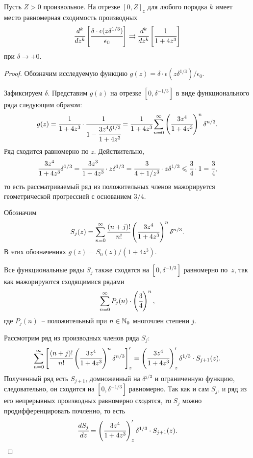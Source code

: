 \begin{proposition}
    \label{prop:convergence_uniform}
    Пусть $Z > 0$ произвольное. На отрезке $[0, Z]_z$ для любого порядка $k$ имеет место равномерная сходимость производных
    \[
        \cfrac{d^k}{d z^k} \left[ \cfrac{\delta \cdot \epsilon(z \delta^{1/3})}{\epsilon_0} \right] \rightrightarrows \cfrac{d^k}{d z^k} \left[ \cfrac{1}{1 + 4 z^3} \right]
    \]
    при $\delta \to +0$.
\end{proposition}
\begin{proof}

Обозначим исследуемую функцию $g(z) = \delta \cdot \epsilon(z \delta^{1/3}) / \epsilon_0$.

Зафиксируем $\delta$. Представим $g(z)$ на отрезке $[0, \delta^{-1/3}]$ в виде функционального ряда следующим образом:
\[
    g(z) = \cfrac{1}{1 + 4 z^3} \cdot \cfrac{1}{1 - \cfrac{3 z^4 \delta^{1/3}}{1 + 4 z^3}} = \cfrac{1}{1 + 4 z^3} \sum\limits_{n = 0}^\infty \left( \cfrac{3 z^4}{1 + 4 z^3} \right)^n \delta^{n / 3}.
\]
Ряд сходится равномерно по $z$. Действительно,
\[
    \cfrac{3 z^4}{1 + 4 z^3} \delta^{1/3} = \cfrac{3 z^3}{1 + 4 z^3} \cdot z \delta^{1/3} = \cfrac{3}{4 + 1 / z^3} \cdot z \delta^{1/3} \leqslant \cfrac{3}{4} \cdot 1 = \cfrac{3}{4},
\]
то есть рассматриваемый ряд из положительных членов мажорируется геометрической прогрессией с основанием $3/4$.

Обозначим
\[
    S_j(z) = \sum\limits_{n = 0}^\infty \cfrac{(n + j)!}{n!} \left( \cfrac{3 z^4}{1 + 4 z^3} \right)^n \delta^{n / 3}.
\]
В этих обозначениях $g(z) = S_0(z) / (1 + 4 z^3)$.

Все функциональные ряды $S_j$ также сходятся на $[0, \delta^{-1/3}]$ равномерно по~$z$, так как мажорируются сходящимися рядами
\[
    \sum\limits_{n = 0}^\infty P_j(n) \cdot \left( \cfrac{3}{4} \right)^n,
\]
где $P_j(n)$~-- положительный при $n \in {\mathbb{N}}_0$ многочлен степени $j$.

Рассмотрим ряд из производных членов ряда $S_j$:
\[
    \sum\limits_{n = 0}^\infty \left[ \cfrac{(n + j)!}{n!} \left( \cfrac{3 z^4}{1 + 4 z^3} \right)^n \delta^{n / 3} \right]'_z = \left( \cfrac{3 z^4}{1 + 4 z^3} \right)'_z \delta^{1/3} \cdot S_{j + 1}(z).
\]
Полученный ряд есть $S_{j + 1}$, домноженный на $\delta^{j / 3}$ и ограниченную функцию, следовательно, он сходится на $[0, \delta^{-1/3}]$ равномерно. Так как и сам $S_j$, и ряд из его непрерывных производных равномерно сходятся, то $S_j$ можно продифференцировать почленно, то есть
\[
    \cfrac{d S_j}{dz} = \left( \cfrac{3 z^4}{1 + 4 z^3} \right)'_z \delta^{1/3} \cdot S_{j + 1}(z).
\]


\end{proof}
